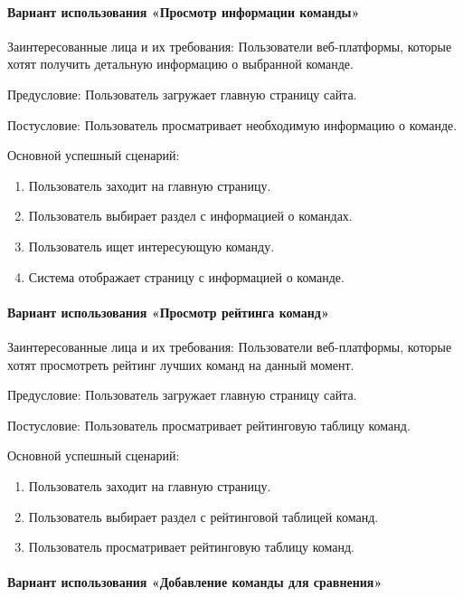 \paragraph{Вариант использования «Просмотр информации команды»}

Заинтересованные лица и их требования: Пользователи веб-платформы, которые хотят получить детальную информацию о выбранной команде.

Предусловие: Пользователь загружает главную страницу сайта.

Постусловие: Пользователь просматривает необходимую информацию о команде.

Основной успешный сценарий:
\begin{enumerate}
	\item Пользователь заходит на главную страницу.
	\item Пользователь выбирает раздел с информацией о командах.
	\item Пользователь ищет интересующую команду.
	\item Система отображает страницу с информацией о команде.
\end{enumerate}

\paragraph{Вариант использования «Просмотр рейтинга команд»}

Заинтересованные лица и их требования: Пользователи веб-платформы, которые хотят просмотреть рейтинг лучших команд на данный момент.

Предусловие: Пользователь загружает главную страницу сайта.

Постусловие: Пользователь просматривает рейтинговую таблицу команд.

Основной успешный сценарий:
\begin{enumerate}
	\item Пользователь заходит на главную страницу.
	\item Пользователь выбирает раздел с рейтинговой таблицей команд.
	\item Пользователь просматривает рейтинговую таблицу команд.
\end{enumerate}

\paragraph{Вариант использования «Добавление команды для сравнения»}

